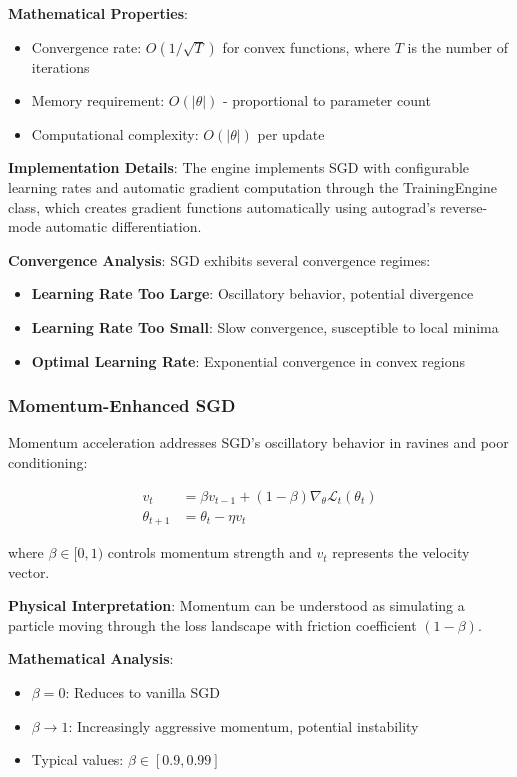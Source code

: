 \documentclass[11pt,a4paper]{report}
\begin{document}
\textbf{Mathematical Properties}:
\begin{itemize}
\item Convergence rate: $O(1/\sqrt{T})$ for convex functions, where $T$ is the number of iterations
\item Memory requirement: $O(|\theta|)$ - proportional to parameter count
\item Computational complexity: $O(|\theta|)$ per update
\end{itemize}

\textbf{Implementation Details}: The engine implements SGD with configurable learning rates and automatic gradient computation through the TrainingEngine class, which creates gradient functions automatically using autograd's reverse-mode automatic differentiation.

\textbf{Convergence Analysis}: SGD exhibits several convergence regimes:
\begin{itemize}
\item \textbf{Learning Rate Too Large}: Oscillatory behavior, potential divergence
\item \textbf{Learning Rate Too Small}: Slow convergence, susceptible to local minima
\item \textbf{Optimal Learning Rate}: Exponential convergence in convex regions
\end{itemize}

\subsubsection{Momentum-Enhanced SGD}

Momentum acceleration addresses SGD's oscillatory behavior in ravines and poor conditioning:

\begin{align}
v_t &= \beta v_{t-1} + (1 - \beta) \nabla_\theta \mathcal{L}_t(\theta_t) \\
\theta_{t+1} &= \theta_t - \eta v_t
\end{align}

where $\beta \in [0, 1)$ controls momentum strength and $v_t$ represents the velocity vector.

\textbf{Physical Interpretation}: Momentum can be understood as simulating a particle moving through the loss landscape with friction coefficient $(1 - \beta)$.

\textbf{Mathematical Analysis}: 
\begin{itemize}
\item $\beta = 0$: Reduces to vanilla SGD
\item $\beta \rightarrow 1$: Increasingly aggressive momentum, potential instability
\item Typical values: $\beta \in [0.9, 0.99]$
\end{itemize}
\end{document}
